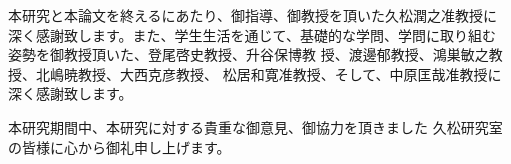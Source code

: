 \documentclass[main]{subfiles}
\begin{document}
\acknowledgment

本研究と本論文を終えるにあたり、御指導、御教授を頂いた久松潤之准教授に
深く感謝致します。また、学生生活を通じて、基礎的な学問、学問に取り組む
姿勢を御教授頂いた、登尾啓史教授、升谷保博教
授、渡邊郁教授、鴻巣敏之教授、北嶋暁教授、大西克彦教授、
松居和寛准教授、そして、中原匡哉准教授に深く感謝致します。

本研究期間中、本研究に対する貴重な御意見、御協力を頂きました
久松研究室の皆様に心から御礼申し上げます。
\end{document}
